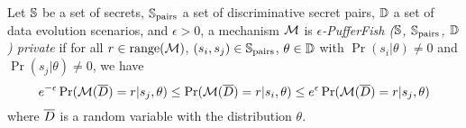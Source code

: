 
\begin{definition}
  Let $\mathbb{S}$ be a set of secrets, $\mathbb{S}_{\textmd{pairs}}$ a set of
  discriminative secret pairs, $\mathbb{D}$ a set of data evolution
  scenarios, and $\epsilon > 0$, a mechanism $\mathcal{M}$ is
  \emph{$\epsilon$-PufferFish ($\mathbb{S}$, $\mathbb{S}_{\textmd{pairs}}$,
    $\mathbb{D}$) private} if for all $r \in \textmd{range}(\mathcal{M})$, $(s_i, s_j) \in
    \mathbb{S}_{\textmd{pairs}}$, $\theta \in \mathbb{D}$ with $\Pr (s_i |
    \theta) \neq 0$ and $\Pr (s_j | \theta) \neq 0$, we have
    \[
      e^{-\epsilon} \Pr (\mathcal{M} (\overline{D}) = r | s_j, \theta) \leq
      \Pr (\mathcal{M} (\overline{D}) = r | s_i, \theta) \leq
      e^\epsilon \Pr (\mathcal{M} (\overline{D}) = r | s_j, \theta)
    \]
    where $\overline{D}$ is a random variable with the distribution $\theta$.
\end{definition}


  